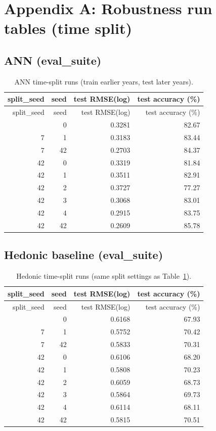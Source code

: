\documentclass[11pt]{article}
\begin{document}
\appendix

\section{Appendix A: Robustness run tables (time split)}
\subsection{ANN (eval\_suite)}
\begin{longtable}{@{}rrrr@{}}
\caption{ANN time-split runs (train earlier years, test later years).}\label{tab:ann-time-runs}\\
\toprule
split\_seed & seed & test RMSE(log) & test accuracy (\%) \\
\midrule
\endfirsthead
\toprule
split\_seed & seed & test RMSE(log) & test accuracy (\%) \\
\midrule
\endhead
\bottomrule
\endfoot
\bottomrule
\endlastfoot
7  & 0  & 0.3281 & 82.67 \\
7  & 1  & 0.3183 & 83.44 \\
7  & 42 & 0.2703 & 84.37 \\
42 & 0  & 0.3319 & 81.84 \\
42 & 1  & 0.3511 & 82.91 \\
42 & 2  & 0.3727 & 77.27 \\
42 & 3  & 0.3068 & 83.01 \\
42 & 4  & 0.2915 & 83.75 \\
42 & 42 & 0.2609 & 85.78 \\
\end{longtable}

\subsection{Hedonic baseline (eval\_suite)}
\begin{longtable}{@{}rrrr@{}}
\caption{Hedonic time-split runs (same split settings as Table~\ref{tab:ann-time-runs}).}\label{tab:hed-time-runs}\\
\toprule
split\_seed & seed & test RMSE(log) & test accuracy (\%) \\
\midrule
\endfirsthead
\toprule
split\_seed & seed & test RMSE(log) & test accuracy (\%) \\
\midrule
\endhead
\bottomrule
\endfoot
\bottomrule
\endlastfoot
7  & 0  & 0.6168 & 67.93 \\
7  & 1  & 0.5752 & 70.42 \\
7  & 42 & 0.5833 & 70.31 \\
42 & 0  & 0.6106 & 68.20 \\
42 & 1  & 0.5808 & 70.23 \\
42 & 2  & 0.6059 & 68.73 \\
42 & 3  & 0.5864 & 69.73 \\
42 & 4  & 0.6114 & 68.11 \\
42 & 42 & 0.5815 & 70.51 \\
\end{longtable}
\end{document}
